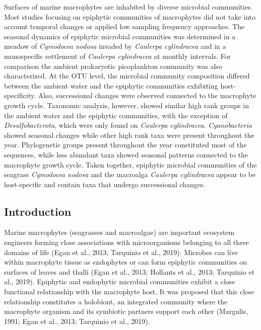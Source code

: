 \documentclass[
  12pt,
]{article}
\begin{document}
Surfaces of marine macrophytes are inhabited by diverse microbial
communities. Most studies focusing on epiphytic communities of
macrophytes did not take into account temporal changes or applied low
sampling frequency approaches. The seasonal dynamics of epiphytic
microbial communities was determined in a meadow of \emph{Cymodocea
nodosa} invaded by \emph{Caulerpa cylindracea} and in a monospecific
settlement of \emph{Caulerpa cylindracea} at monthly intervals. For
comparison the ambient prokaryotic picoplankton community was also
characterized. At the OTU level, the microbial community composition
differed between the ambient water and the epiphytic communities
exhibiting host-specificity. Also, successional changes were observed
connected to the macrophyte growth cycle. Taxonomic analysis, however,
showed similar high rank groups in the ambient water and the epiphytic
communities, with the exception of \emph{Desulfobacterota}, which were
only found on \emph{Caulerpa cylindracea}. \emph{Cyanobacteria} showed
seasonal changes while other high rank taxa were present throughout the
year. Phylogenetic groups present throughout the year constituted most
of the sequences, while less abundant taxa showed seasonal patterns
connected to the macrophyte growth cycle. Taken together, epiphytic
microbial communities of the seagrass \emph{Cymodocea nodosa} and the
macroalga \emph{Caulerpa cylindracea} appear to be host-specific and
contain taxa that undergo successional changes.

\newpage

\hypertarget{introduction}{%
\subsection{Introduction}\label{introduction}}

Marine macrophytes (seagrasses and macroalgae) are important ecosystem
engineers forming close associations with microorganisms belonging to
all three domains of life (Egan et al., 2013; Tarquinio et al., 2019).
Microbes can live within macrophyte tissue as endophytes or can form
epiphytic communities on surfaces of leaves and thalli (Egan et al.,
2013; Hollants et al., 2013; Tarquinio et al., 2019). Epiphytic and
endophytic microbial communities exhibit a close functional relationship
with the macrophyte host. It was proposed that this close relationship
constitutes a holobiont, an integrated community where the macrophyte
organism and its symbiotic partners support each other (Margulis, 1991;
Egan et al., 2013; Tarquinio et al., 2019).
\end{document}
